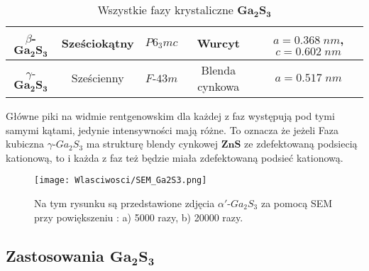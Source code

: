 \begin{table}[H]
\begin{tabular}{|c|c|c|c|c|}
		$\beta$-$\mathbf{Ga_{2}S_{3}}$                              & Sześciokątny                                                                & $P6_{3}mc$                     & Wurcyt                                                            & $a=0.368\;nm$,                                                                                           $c=0.602\;nm$                                                                              \\ \hline
		$\gamma$-$\mathbf{Ga_{2}S_{3}}$                              & Sześcienny                                                                  & $F$-$43m$                       & Blenda cynkowa                                                    & $a=0.517\;nm$                                                                            \\ \hline
	\end{tabular}
	\caption{Wszystkie fazy krystaliczne $\mathbf{Ga_{2}S_{3}}$}
\end{table}

Główne piki na widmie rentgenowskim dla każdej z faz występują pod tymi samymi kątami, jedynie intensywności mają różne. To oznacza że jeżeli Faza kubiczna $\gamma$-$Ga_{2}S_{3}$ ma strukturę blendy cynkowej $\mathbf{ZnS}$ ze zdefektowaną podsiecią kationową, to i każda z faz też będzie miała zdefektowaną podsieć kationową.

\begin{figure}[H]
	\begin{center}
		\texttt{[image: Wlasciwosci/SEM\_Ga2S3.png]}
		\caption{Na tym rysunku są przedstawione zdjęcia $\alpha'$-$Ga_{2}S_{3}$ za pomocą SEM przy powiększeniu : a) 5000 razy, b) 20000 razy.}
	\end{center}
\end{figure}

\subsection{Zastosowania $\mathbf{Ga_{2}S_{3}}$}

